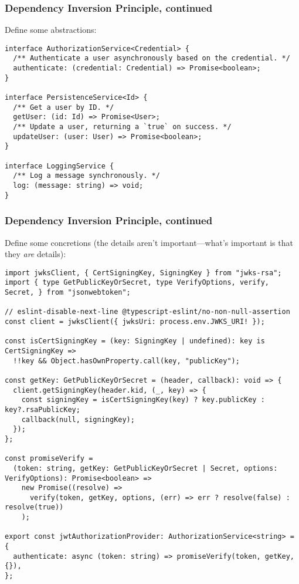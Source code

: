 \documentclass[aspectratio=169]{beamer}
\begin{document}
\begin{frame}[fragile]
  \frametitle{Dependency Inversion Principle, continued}
  Define some abstractions:

  \vspace{1em}

  \begin{verbatim}
interface AuthorizationService<Credential> {
  /** Authenticate a user asynchronously based on the credential. */
  authenticate: (credential: Credential) => Promise<boolean>;
}

interface PersistenceService<Id> {
  /** Get a user by ID. */
  getUser: (id: Id) => Promise<User>;
  /** Update a user, returning a `true` on success. */
  updateUser: (user: User) => Promise<boolean>;
}

interface LoggingService {
  /** Log a message synchronously. */
  log: (message: string) => void;
}
\end{verbatim}
\end{frame}

\begin{frame}[fragile]
  \frametitle{Dependency Inversion Principle, continued}
  Define some concretions (the details aren't important---what's important is
  that they \emph{are} details):

  \vspace{1em}

  \begin{verbatim}
import jwksClient, { CertSigningKey, SigningKey } from "jwks-rsa";
import { type GetPublicKeyOrSecret, type VerifyOptions, verify, Secret, } from "jsonwebtoken";

// eslint-disable-next-line @typescript-eslint/no-non-null-assertion
const client = jwksClient({ jwksUri: process.env.JWKS_URI! });

const isCertSigningKey = (key: SigningKey | undefined): key is CertSigningKey =>
  !!key && Object.hasOwnProperty.call(key, "publicKey");

const getKey: GetPublicKeyOrSecret = (header, callback): void => {
  client.getSigningKey(header.kid, (_, key) => {
    const signingKey = isCertSigningKey(key) ? key.publicKey : key?.rsaPublicKey;
    callback(null, signingKey);
  });
};

const promiseVerify =
  (token: string, getKey: GetPublicKeyOrSecret | Secret, options: VerifyOptions): Promise<boolean> =>
    new Promise((resolve) =>
      verify(token, getKey, options, (err) => err ? resolve(false) : resolve(true))
    );

export const jwtAuthorizationProvider: AuthorizationService<string> = {
  authenticate: async (token: string) => promiseVerify(token, getKey, {}),
};
  \end{verbatim}
\end{frame}
\end{document}
